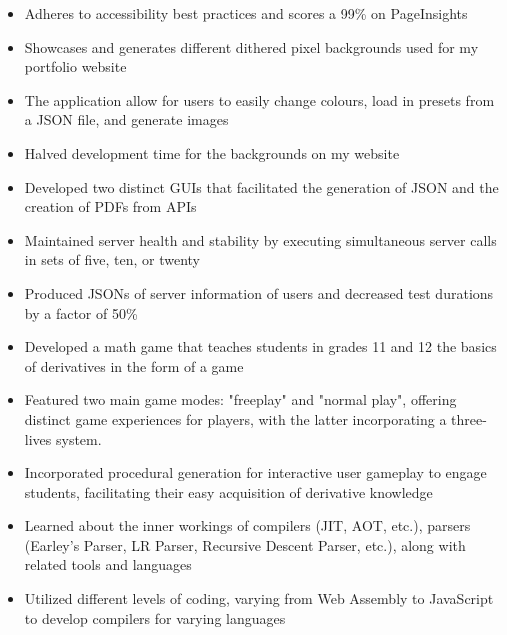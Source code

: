 \documentclass[10pt,a4paper,ragged2e,withhyper,darkmode]{altacv}
\begin{document}
\begin{paracol}{1}
\begin{itemize}
    \item{Adheres to accessibility best practices and scores a 99\% on PageInsights}
  \end{itemize}
  \divider
  \begin{itemize}
    \item{Showcases and generates different dithered pixel backgrounds used for my portfolio website}
    \item{The application allow for users to easily change colours, load in presets from a JSON file, and generate images}
    \item{Halved development time for the backgrounds on my website}
  \end{itemize}
  \divider
  \begin{itemize}
    \item{Developed two distinct GUIs that facilitated the generation of JSON and the creation of PDFs from APIs}
    \item{Maintained server health and stability by executing simultaneous server calls in sets of five, ten, or twenty}
    \item{Produced JSONs of server information of users and decreased test durations by a factor of 50\%}
  \end{itemize}
  \divider
  \begin{itemize}
    \item{Developed a math game that teaches students in grades 11 and 12 the basics of derivatives in the form of a game}
    \item{Featured two main game modes: "freeplay" and "normal play", offering distinct game experiences for players, with the latter incorporating a three-lives system.}
    \item{Incorporated procedural generation for interactive user gameplay to engage students, facilitating their easy acquisition of derivative knowledge}
  \end{itemize}


  \begin{itemize}
    \item{Learned about the inner workings of compilers (JIT, AOT, etc.), parsers (Earley's Parser, LR Parser, Recursive Descent Parser, etc.), along with related tools and languages}
    \item{Utilized different levels of coding, varying from Web Assembly to JavaScript to develop compilers for varying languages}
  \end{itemize}


\end{paracol}
\end{document}
